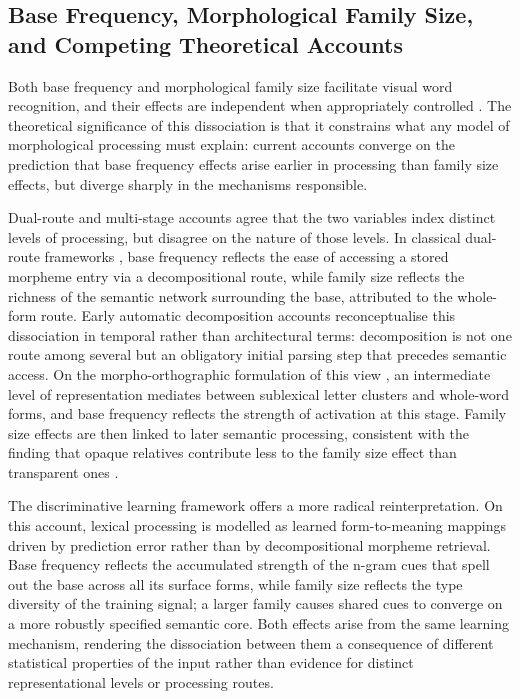 	
	\subsection{Base Frequency, Morphological Family Size, and Competing Theoretical Accounts}
	
	Both base frequency and morphological family size facilitate visual word recognition, and their effects are independent when appropriately controlled \citep{fordDerivationalMorphologyBase2010}. The theoretical significance of this dissociation is that it constrains what any model of morphological processing must explain: current accounts converge on the prediction that base frequency effects arise earlier in processing than family size effects, but diverge sharply in the mechanisms responsible.
	
	Dual-route and multi-stage accounts agree that the two variables index distinct levels of processing, but disagree on the nature of those levels. In classical dual-route frameworks \citep{schreuderModelingMorphologicalProcessing1995, dejongMorphologicalFamilySize2000}, base frequency reflects the ease of accessing a stored morpheme entry via a decompositional route, while family size reflects the richness of the semantic network surrounding the base, attributed to the whole-form route. Early automatic decomposition accounts \citep{taft_lexical_1975, taftMorphologicalDecompositionReverse2004} reconceptualise this dissociation in temporal rather than architectural terms: decomposition is not one route among several but an obligatory initial parsing step that precedes semantic access. On the morpho-orthographic formulation of this view \citep{rastleMorphologicalDecompositionBased2008, longtinMorphologicalDecompositionEarly2005, morrisSemanticTransparencyMasked2007}, an intermediate level of representation mediates between sublexical letter clusters and whole-word forms, and base frequency reflects the strength of activation at this stage. Family size effects are then linked to later semantic processing, consistent with the finding that opaque relatives contribute less to the family size effect than transparent ones \citep{schreuderHowComplexSimplex1997, dejongMorphologicalFamilySize2000}. 
	
	The discriminative learning framework \citep[NDL/LDL;][]{chuangDiscriminativeLearningLexicon} offers a more radical reinterpretation. On this account, lexical processing is modelled as learned form-to-meaning mappings driven by prediction error rather than by decompositional morpheme retrieval. Base frequency reflects the accumulated strength of the n-gram cues that spell out the base across all its surface forms, while family size reflects the type diversity of the training signal; a larger family causes shared cues to converge on a more robustly specified semantic core. Both effects arise from the same learning mechanism, rendering the dissociation between them a consequence of different statistical properties of the input rather than evidence for distinct representational levels or processing routes.
		
